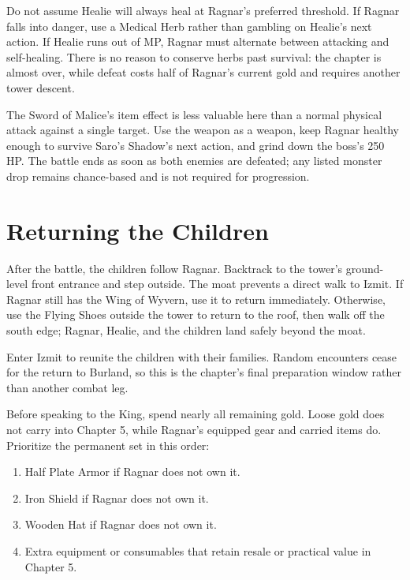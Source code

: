 \documentclass[
  american,
  10pt,
  letterpaper,
  oneside,
  open=any]{scrreprt}
\providecommand{\tightlist}{%
  \setlength{\itemsep}{0pt}\setlength{\parskip}{0pt}}
\begin{document}
Do not assume Healie will always heal at Ragnar's preferred threshold.
If Ragnar falls into danger, use a Medical Herb rather than gambling on
Healie's next action. If Healie runs out of MP, Ragnar must alternate
between attacking and self-healing. There is no reason to conserve herbs
past survival: the chapter is almost over, while defeat costs half of
Ragnar's current gold and requires another tower descent.

The Sword of Malice's item effect is less valuable here than a normal
physical attack against a single target. Use the weapon as a weapon,
keep Ragnar healthy enough to survive Saro's Shadow's next action, and
grind down the boss's 250 HP. The battle ends as soon as both enemies
are defeated; any listed monster drop remains chance-based and is not
required for progression.

\section{Returning the Children}\label{returning-the-children}

After the battle, the children follow Ragnar. Backtrack to the tower's
ground-level front entrance and step outside. The moat prevents a direct
walk to Izmit. If Ragnar still has the Wing of Wyvern, use it to return
immediately. Otherwise, use the Flying Shoes outside the tower to return
to the roof, then walk off the south edge; Ragnar, Healie, and the
children land safely beyond the moat.

Enter Izmit to reunite the children with their families. Random
encounters cease for the return to Burland, so this is the chapter's
final preparation window rather than another combat leg.

Before speaking to the King, spend nearly all remaining gold. Loose gold
does not carry into Chapter 5, while Ragnar's equipped gear and carried
items do. Prioritize the permanent set in this order:

\begin{enumerate}
\def\labelenumi{\arabic{enumi}.}
\tightlist
\item
  Half Plate Armor if Ragnar does not own it.
\item
  Iron Shield if Ragnar does not own it.
\item
  Wooden Hat if Ragnar does not own it.
\item
  Extra equipment or consumables that retain resale or practical value
  in Chapter 5.
\end{enumerate}
\end{document}
